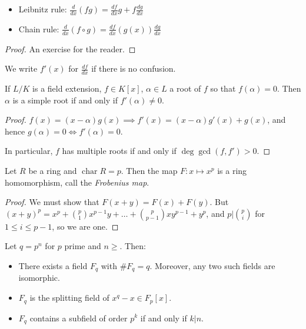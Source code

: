 \documentclass[a4paper, 10pt, twocolumn]{amsart}
\renewcommand{\charr}{\operatorname{char}}
\begin{document}
\begin{proposition}
\item
\begin{itemize}
\item{Leibnitz rule}: $\frac{d}{dx}(fg) = \frac{df}{dx}g + f\frac{dg}{dx}$
\item{Chain rule}: $\frac{d}{dx}(f\circ g) = \frac{df}{dx}(g(x))\frac{dg}{dx}$
\end{itemize}
\end{proposition}
\begin{proof}
An exercise for the reader.
\end{proof}
We write $f'(x)$ for $\frac{df}{dx}$ if there is no confusion.

\begin{lemma}
If $L/K$ is a field extension, $f\in K[x]$, $\alpha\in L$ a root of $f$ so that $f(\alpha)=0$. Then $\alpha$ is a simple root if and only if $f'(\alpha) \neq 0$.
\end{lemma}
\begin{proof}
$f(x) = (x-\alpha)g(x) \implies f'(x) = (x-\alpha)g'(x) + g(x)$, and hence $g(\alpha)=0 \iff f'(\alpha) = 0$.

In particular, $f$ has multiple roots if and only if $\deg \gcd(f,f') > 0$.
\end{proof}
\begin{proposition}
Let $R$ be a ring and $\charr R = p$. Then the map $F:x \mapsto x^p$ is a ring homomorphism, call the \emph{Frobenius map}.
\end{proposition}
\begin{proof}
We must show that $F(x+y) = F(x) + F(y)$. But $(x+y)^p = x^p + \binom{p}{1} x^{p-1} y + \ldots + \binom{p}{p-1} xy^{p-1} + y^p$, and $p|\binom{p}{i}$ for $1\leq i\leq p-1$, so we are one.
\end{proof}
\begin{theorem}
Let $q=p^n$ for $p$ prime and $n\geq $. Then:
\begin{itemize}
\item There exists a field $F_q$ with $\#F_q = q$. Moreover, any two such fields are isomorphic.
\item $F_q$ is the splitting field of $x^q - x\in F_p[x]$.
\item $F_q$ contains a subfield of order $p^k$ if and only if $k|n$.
\end{itemize}
\end{theorem}
\end{document}
